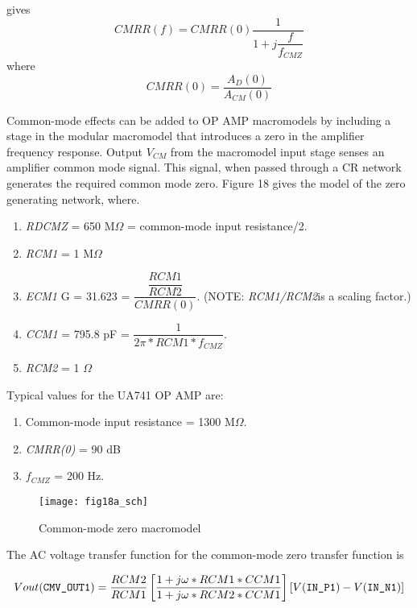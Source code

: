 gives
\begin{equation}
CMRR(f)=CMRR(0)\dfrac{1}{1+j\dfrac{f}{f_{CMZ}}}
\end{equation}
where
\begin{equation}
CMRR(0)=\dfrac{A_{D}(0)}{A_{CM}(0)}
\end{equation}

Common-mode effects can be added to OP AMP macromodels by including a stage in the modular macromodel that introduces a zero in the amplifier frequency response.  Output $V_{CM}$ from the macromodel input stage senses an amplifier common mode signal.  This signal, when passed through a CR network generates the required common mode zero. Figure 18 gives the model of the zero generating network, where.

\begin{enumerate}
\item \textit{RDCMZ} = 650 M$\Omega$ = common-mode input resistance/2.
\item \textit{RCM1 } = 1 M$\Omega$
\item \textit{ECM1}    G = 31.623 = $\dfrac{\dfrac{RCM1}{RCM2}}{CMRR(0)}$. (NOTE: \textit{RCM1/RCM2}is a scaling factor.)
\item \textit{CCM1}  = 795.8 pF = $\dfrac{1}{2\pi*RCM1*f_{CMZ}}$.
\item \textit{RCM2 } = 1 $\Omega$
\end{enumerate}
Typical values for the UA741 OP AMP are:
\begin{enumerate}
\item Common-mode input resistance = 1300 M$\Omega$.
\item \textit{CMRR(0)} =  90 dB 
\item \textit{$f_{CMZ}$} =  200 Hz.
\end{enumerate}


\begin{figure}
  \centering
  \texttt{[image: fig18a\_sch]}
  \caption{Common-mode zero macromodel}
  \label{fig:opamp18a}
\end{figure}

The AC voltage transfer function for the common-mode zero transfer function is

\begin{equation}
Vout(\verb|CMV_OUT1|)=\dfrac{RCM2}{RCM1}\left[  \dfrac{1+j\omega*RCM1*CCM1}{1+j\omega*RCM2*CCM1}\right] \left[ V(\verb|IN_P1|)-V(\verb|IN_N1|)\right] 
\end{equation}

